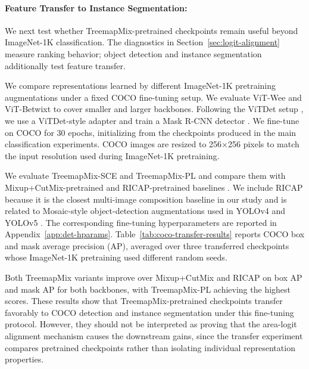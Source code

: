 \paragraph{Feature Transfer to Instance Segmentation:}

We next test whether TreemapMix-pretrained checkpoints remain useful beyond
ImageNet-1K classification. The diagnostics in Section~\ref{sec:logit-alignment} measure ranking behavior;
object detection and instance segmentation additionally test feature transfer.

We compare representations learned by different ImageNet-1K pretraining
augmentations under a fixed COCO fine-tuning setup. We evaluate ViT-Wee and ViT-Betwixt to cover smaller and
larger backbones. Following the ViTDet setup
\citep{liExploringPlainVision2022}, we use a ViTDet-style adapter and train a
Mask R-CNN detector \citep{liExploringPlainVision2022,heMaskRCNN2018}. We
fine-tune on COCO for 30 epochs, initializing from the checkpoints produced in
the main classification experiments. COCO images are resized to
256$\times$256 pixels to match the input resolution used during ImageNet-1K
pretraining.

We evaluate TreemapMix-SCE and TreemapMix-PL and compare them with
Mixup+CutMix-pretrained and RICAP-pretrained baselines
\citep{takahashiDataAugmentationUsing2020}. We include RICAP because it is the
closest multi-image composition baseline in our study and is related to
Mosaic-style object-detection augmentations used in YOLOv4 and YOLOv5
\citep{bochkovskiyYOLOv4OptimalSpeed2020,jocherYOLOv5Ultralytics2020}. The
corresponding fine-tuning hyperparameters are reported in
Appendix~\ref{app:det-hparams}. Table~\ref{tab:coco-transfer-results} reports
COCO box and mask average precision (AP), averaged over three transferred checkpoints whose
ImageNet-1K pretraining used different random seeds.



Both TreemapMix variants improve over Mixup+CutMix and RICAP on box AP and
mask AP for both backbones, with TreemapMix-PL achieving the highest scores.
These results show that TreemapMix-pretrained checkpoints transfer favorably to
COCO detection and instance segmentation under this fine-tuning protocol.
However, they should not be interpreted as proving that the area-logit
alignment mechanism causes the downstream gains, since the transfer experiment
compares pretrained checkpoints rather than isolating individual representation
properties.
